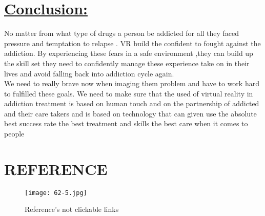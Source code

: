 \documentclass[12pts]{article}
\begin{document}
\section*{\underline{Conclusion:}}
\begin{large}
\begin{flushleft}
No matter from what type of drugs a person be 
addicted for all they faced pressure and temptation to relapse . VR build the confident to fought against the addiction. By experiencing these fears in a safe environment ,they can build up the skill set they need to confidently manage these experience take on in their lives and avoid falling back into addiction 
cycle again.\\
We need to really brave now when imaging them problem and have to work hard to fulfilled these goals. We need to make sure that the used of virtual reality in addiction treatment is based on human touch and on the partnership of addicted and their care takers and is based on technology that can given use the absolute best success rate the best treatment and skills the best care when it comes to people
\end{flushleft}
\end{large}
\clearpage
\section*{REFERENCE }
\begin{figure}[h]
\centering
\texttt{[image: 62-5.jpg]}
\caption{Reference's not clickable links}
\end{figure}
\end{document}
